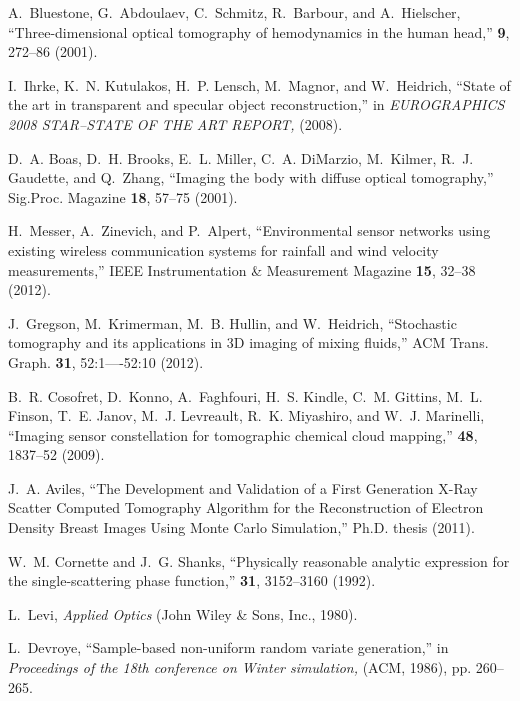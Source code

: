 \documentclass[10pt,letterpaper]{article}
\begin{document}
\begin{thebibliography}{10}
A.~Bluestone, G.~Abdoulaev, C.~Schmitz, R.~Barbour, and A.~Hielscher,
  \enquote{{Three-dimensional optical tomography of hemodynamics in the human
  head},} \opex \textbf{9}, 272--86 (2001).

I.~Ihrke, K.~N. Kutulakos, H.~P. Lensch, M.~Magnor, and W.~Heidrich,
  \enquote{{State of the art in transparent and specular object
  reconstruction},} in \emph{EUROGRAPHICS 2008 STAR--STATE OF THE ART
  REPORT,}  (2008).

D.~A. Boas, D.~H. Brooks, E.~L. Miller, C.~A. DiMarzio, M.~Kilmer, R.~J.
  Gaudette, and Q.~Zhang, \enquote{{Imaging the body with diffuse optical
  tomography},} Sig.Proc. Magazine \textbf{18}, 57--75 (2001).

H.~Messer, A.~Zinevich, and P.~Alpert, \enquote{{Environmental sensor networks
  using existing wireless communication systems for rainfall and wind velocity
  measurements},} IEEE Instrumentation \& Measurement Magazine \textbf{15},
  32--38 (2012).

J.~Gregson, M.~Krimerman, M.~B. Hullin, and W.~Heidrich, \enquote{{Stochastic
  tomography and its applications in 3D imaging of mixing fluids},} ACM Trans.
  Graph. \textbf{31}, 52:1----52:10 (2012).

B.~R. Cosofret, D.~Konno, A.~Faghfouri, H.~S. Kindle, C.~M. Gittins, M.~L.
  Finson, T.~E. Janov, M.~J. Levreault, R.~K. Miyashiro, and W.~J. Marinelli,
  \enquote{{Imaging sensor constellation for tomographic chemical cloud
  mapping},} \ao \textbf{48}, 1837--52 (2009).

J.~A. Aviles, \enquote{{The Development and Validation of a First Generation
  X-Ray Scatter Computed Tomography Algorithm for the Reconstruction of
  Electron Density Breast Images Using Monte Carlo Simulation},} Ph.D. thesis
  (2011).

W.~M. Cornette and J.~G. Shanks, \enquote{{Physically reasonable analytic
  expression for the single-scattering phase function},} \ao
  \textbf{31}, 3152--3160 (1992).

L.~Levi, \emph{{Applied Optics}} (John Wiley \& Sons, Inc., 1980).

L.~Devroye, \enquote{{Sample-based non-uniform random variate generation},} in
  \emph{Proceedings of the 18th conference on Winter simulation,}  (ACM,
  1986), pp. 260--265.


\end{thebibliography}
\end{document}
